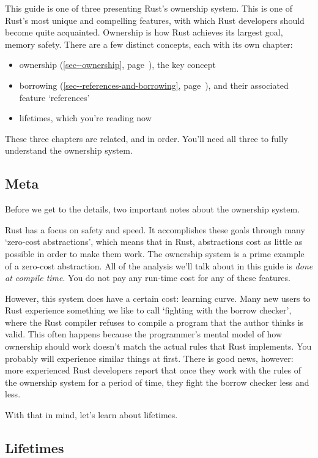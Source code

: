 \documentclass[a4paper,]{book}
\renewcommand*{\hyperref}[2][\ar]{%
  \def\ar{#2}%
  #2 (\autoref{#1}, page~\pageref{#1})}
\providecommand{\tightlist}{%
  \setlength{\itemsep}{0pt}\setlength{\parskip}{0pt}}
\begin{document}
This guide is one of three presenting Rust's ownership system. This is
one of Rust's most unique and compelling features, with which Rust
developers should become quite acquainted. Ownership is how Rust
achieves its largest goal, memory safety. There are a few distinct
concepts, each with its own chapter:

\begin{itemize}
\tightlist
\item
  \hyperref[sec--ownership]{ownership}, the key concept
\item
  \hyperref[sec--references-and-borrowing]{borrowing}, and their
  associated feature `references'
\item
  lifetimes, which you're reading now
\end{itemize}

These three chapters are related, and in order. You'll need all three to
fully understand the ownership system.

\subsection{Meta}\label{meta-2}

Before we get to the details, two important notes about the ownership
system.

Rust has a focus on safety and speed. It accomplishes these goals
through many `zero-cost abstractions', which means that in Rust,
abstractions cost as little as possible in order to make them work. The
ownership system is a prime example of a zero-cost abstraction. All of
the analysis we'll talk about in this guide is \emph{done at compile
time}. You do not pay any run-time cost for any of these features.

However, this system does have a certain cost: learning curve. Many new
users to Rust experience something we like to call `fighting with the
borrow checker', where the Rust compiler refuses to compile a program
that the author thinks is valid. This often happens because the
programmer's mental model of how ownership should work doesn't match the
actual rules that Rust implements. You probably will experience similar
things at first. There is good news, however: more experienced Rust
developers report that once they work with the rules of the ownership
system for a period of time, they fight the borrow checker less and
less.

With that in mind, let's learn about lifetimes.

\subsection{Lifetimes}\label{lifetimes}
\end{document}
